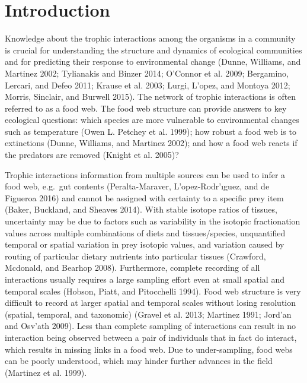 \documentclass{article}
\begin{document}
\hypertarget{introduction}{%
\section{Introduction}\label{introduction}}

Knowledge about the trophic interactions among the organisms in a
community is crucial for understanding the structure and dynamics of
ecological communities and for predicting their response to
environmental change (Dunne, Williams, and Martinez 2002; Tylianakis and
Binzer 2014; O'Connor et al. 2009; Bergamino, Lercari, and Defeo 2011;
Krause et al. 2003; Lurgi, L'opez, and Montoya 2012; Morris, Sinclair,
and Burwell 2015). The network of trophic interactions is often referred
to as a food web. The food web structure can provide answers to key
ecological questions: which species are more vulnerable to environmental
changes such as temperature (Owen L. Petchey et al. 1999); how robust a
food web is to extinctions (Dunne, Williams, and Martinez 2002); and how
a food web reacts if the predators are removed (Knight et al. 2005)?

Trophic interactions information from multiple sources can be used to
infer a food web, e.g.~gut contents (Peralta-Maraver, L'opez-Rodr'ıguez,
and de Figueroa 2016) and cannot be assigned with certainty to a
specific prey item (Baker, Buckland, and Sheaves 2014). With stable
isotope ratios of tissues, uncertainty may be due to factors such as
variability in the isotopic fractionation values across multiple
combinations of diets and tissues/species, unquantified temporal or
spatial variation in prey isotopic values, and variation caused by
routing of particular dietary nutrients into particular tissues
(Crawford, Mcdonald, and Bearhop 2008). Furthermore, complete recording
of all interactions usually requires a large sampling effort even at
small spatial and temporal scales (Hobson, Piatt, and Pitocchelli 1994).
Food web structure is very difficult to record at larger spatial and
temporal scales without losing resolution (spatial, temporal, and
taxonomic) (Gravel et al. 2013; Martinez 1991; Jord'an and Osv'ath
2009). Less than complete sampling of interactions can result in no
interaction being observed between a pair of individuals that in fact do
interact, which results in missing links in a food web. Due to
under-sampling, food webs can be poorly understood, which may hinder
further advances in the field (Martinez et al. 1999).
\end{document}
